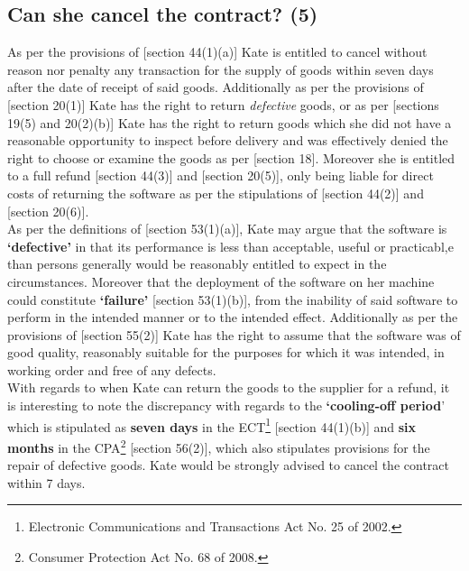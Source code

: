 \documentclass[11pt]{article}
\begin{document}
\subsection{Can she cancel the contract? (5)}
\label{sec:org8f3ca5a}

As per the provisions of [section 44(1)(a)]\cite{rsa02_elect_comm_trans_act} Kate
is entitled to cancel without reason nor penalty any transaction for the supply of
goods within seven days after the date of receipt of said goods. Additionally as
per the provisions of [section 20(1)]\cite{rsa08_cpa} Kate has the right to return
\emph{defective} goods, or as per [sections 19(5) and 20(2)(b)]\cite{rsa08_cpa} Kate
has the right to return goods which she did not have a reasonable opportunity to
inspect before delivery and was effectively denied the right to choose or
examine the goods as per [section 18]\cite{rsa08_cpa}. Moreover she is entitled to
a full refund [section 44(3)]\cite{rsa02_elect_comm_trans_act} and [section
20(5)]\cite{rsa08_cpa}, only being liable for direct costs of returning the
software as per the stipulations of [section
44(2)]\cite{rsa02_elect_comm_trans_act} and [section 20(6)]\cite{rsa08_cpa}.\\

As per the definitions of [section 53(1)(a)]\cite{rsa08_cpa}, Kate may argue that
the software is \textbf{`defective'} in that its performance is less than acceptable,
useful or practicabl,e than persons generally would be reasonably entitled to
expect in the circumstances. Moreover that the deployment of the software on her
machine could constitute \textbf{`failure'} [section 53(1)(b)]\cite{rsa08_cpa}, from the
inability of said software to perform in the intended manner or to the intended
effect. Additionally as per the provisions of [section 55(2)]\cite{rsa08_cpa} Kate
has the right to assume that the software was of good quality, reasonably
suitable for the purposes for which it was intended, in working order and free
of any defects.\\

With regards to when Kate can return the goods to the supplier for a refund, it
is interesting to note the discrepancy with regards to the \textbf{`cooling-off period}'
which is stipulated as \textbf{seven days} in the ECT\footnote{Electronic Communications
and Transactions Act No. 25 of 2002.} [section
44(1)(b)]\cite{rsa02_elect_comm_trans_act} and \textbf{six months} in the
CPA\footnote{Consumer Protection Act No. 68 of 2008.} [section 56(2)]\cite{rsa08_cpa},
which also stipulates provisions for the repair of defective goods. Kate would
be strongly advised to cancel the contract within 7 days.
\end{document}
